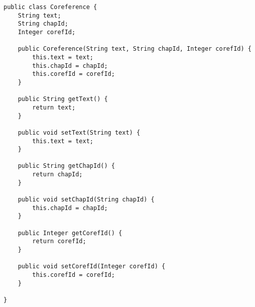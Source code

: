 \begin{lstlisting}[caption=Coreference-Klasse,label=code:Coreference, name=Coreference.java]
public class Coreference {
	String text;
	String chapId;
	Integer corefId;

	public Coreference(String text, String chapId, Integer corefId) {
		this.text = text;
		this.chapId = chapId;
		this.corefId = corefId;
	}

	public String getText() {
		return text;
	}

	public void setText(String text) {
		this.text = text;
	}

	public String getChapId() {
		return chapId;
	}

	public void setChapId(String chapId) {
		this.chapId = chapId;
	}

	public Integer getCorefId() {
		return corefId;
	}

	public void setCorefId(Integer corefId) {
		this.corefId = corefId;
	}

}
\end{lstlisting}

